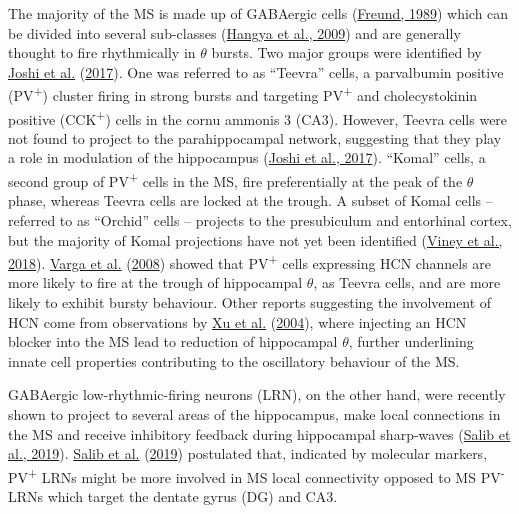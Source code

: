 \documentclass[
  12pt,
  a4paper,
  openany]{book}
\begin{document}
The majority of the MS is made up of GABAergic cells (\protect\hyperlink{ref-freund_gabaergic_1989}{Freund, 1989}) which can be divided into several sub-classes (\protect\hyperlink{ref-hangya_gabaergic_2009}{Hangya et al., 2009}) and are generally thought to fire rhythmically in \(\theta\) bursts. Two major groups were identified by \protect\hyperlink{ref-joshi_behavior-dependent_2017}{Joshi et al.} (\protect\hyperlink{ref-joshi_behavior-dependent_2017}{2017}). One was referred to as ``Teevra'' cells, a parvalbumin positive (PV\textsuperscript{+}) cluster firing in strong bursts and targeting PV\textsuperscript{+} and cholecystokinin positive (CCK\textsuperscript{+}) cells in the cornu ammonis 3 (CA3). However, Teevra cells were not found to project to the parahippocampal network, suggesting that they play a role in modulation of the hippocampus (\protect\hyperlink{ref-joshi_behavior-dependent_2017}{Joshi et al., 2017}). ``Komal'' cells, a second group of PV\textsuperscript{+} cells in the MS, fire preferentially at the peak of the \(\theta\) phase, whereas Teevra cells are locked at the trough. A subset of Komal cells -- referred to as ``Orchid'' cells -- projects to the presubiculum and entorhinal cortex, but the majority of Komal projections have not yet been identified (\protect\hyperlink{ref-viney_shared_2018}{Viney et al., 2018}). \protect\hyperlink{ref-varga_presence_2008}{Varga et al.} (\protect\hyperlink{ref-varga_presence_2008}{2008}) showed that PV\textsuperscript{+} cells expressing HCN channels are more likely to fire at the trough of hippocampal \(\theta\), as Teevra cells, and are more likely to exhibit bursty behaviour. Other reports suggesting the involvement of HCN come from observations by \protect\hyperlink{ref-xu_hippocampal_2004}{Xu et al.} (\protect\hyperlink{ref-xu_hippocampal_2004}{2004}), where injecting an HCN blocker into the MS lead to reduction of hippocampal \(\theta\), further underlining innate cell properties contributing to the oscillatory behaviour of the MS.

GABAergic low-rhythmic-firing neurons (LRN), on the other hand, were recently shown to project to several areas of the hippocampus, make local connections in the MS and receive inhibitory feedback during hippocampal sharp-waves (\protect\hyperlink{ref-salib_gabaergic_2019}{Salib et al., 2019}). \protect\hyperlink{ref-salib_gabaergic_2019}{Salib et al.} (\protect\hyperlink{ref-salib_gabaergic_2019}{2019}) postulated that, indicated by molecular markers, PV\textsuperscript{+} LRNs might be more involved in MS local connectivity opposed to MS PV\textsuperscript{-} LRNs which target the dentate gyrus (DG) and CA3.
\end{document}
